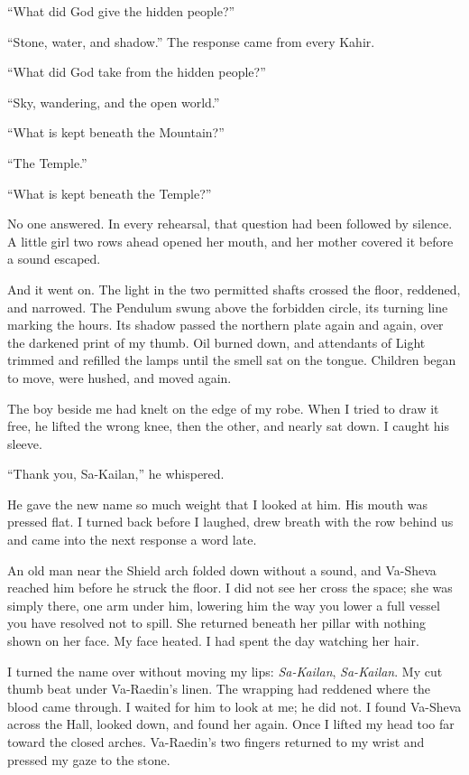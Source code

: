 ``What did God give the hidden people?'' \par
``Stone, water, and shadow.'' The response came from every Kahir. \par
``What did God take from the hidden people?'' \par
``Sky, wandering, and the open world.'' \par
``What is kept beneath the Mountain?'' \par
``The Temple.'' \par
``What is kept beneath the Temple?'' \par

No one answered. In every rehearsal, that question had been followed by silence. A little girl two rows ahead opened her mouth, and her mother covered it before a sound escaped.\par

And it went on. The light in the two permitted shafts crossed the floor, reddened, and narrowed. The Pendulum swung above the forbidden circle, its turning line marking the hours. Its shadow passed the northern plate again and again, over the darkened print of my thumb. Oil burned down, and attendants of Light trimmed and refilled the lamps until the smell sat on the tongue. Children began to move, were hushed, and moved again.\par

The boy beside me had knelt on the edge of my robe. When I tried to draw it free, he lifted the wrong knee, then the other, and nearly sat down. I caught his sleeve.\par

``Thank you, Sa-Kailan,'' he whispered.\par

He gave the new name so much weight that I looked at him. His mouth was pressed flat. I turned back before I laughed, drew breath with the row behind us and came into the next response a word late.\par

An old man near the Shield arch folded down without a sound, and Va-Sheva reached him before he struck the floor. I did not see her cross the space; she was simply there, one arm under him, lowering him the way you lower a full vessel you have resolved not to spill. She returned beneath her pillar with nothing shown on her face. My face heated. I had spent the day watching her hair.\par

I turned the name over without moving my lips: \textit{Sa-Kailan}, \textit{Sa-Kailan}. My cut thumb beat under Va-Raedin's linen. The wrapping had reddened where the blood came through. I waited for him to look at me; he did not. I found Va-Sheva across the Hall, looked down, and found her again. Once I lifted my head too far toward the closed arches. Va-Raedin's two fingers returned to my wrist and pressed my gaze to the stone.\par


